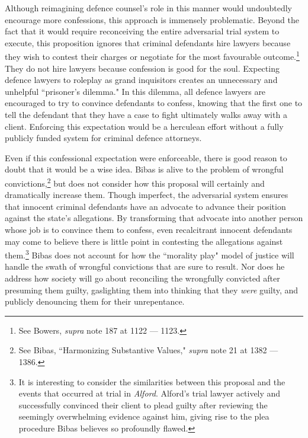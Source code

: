 Although reimagining defence counsel's role in this manner would undoubtedly encourage more confessions, this approach is immensely problematic. Beyond the fact that it would require reconceiving the entire adversarial trial system to execute, this proposition ignores that criminal defendants hire lawyers because they wish to contest their charges or negotiate for the most favourable outcome.\footnote{See Bowers, \textit{supra} note 187 at 1122 — 1123.} They do not hire lawyers because confession is good for the soul. Expecting defence lawyers to roleplay as grand inquisitors creates an unnecessary and unhelpful ``prisoner's dilemma." In this dilemma, all defence lawyers are encouraged to try to convince defendants to confess, knowing that the first one to tell the defendant that they have a case to fight ultimately walks away with a client. Enforcing this expectation would be a herculean effort without a fully publicly funded system for criminal defence attorneys.

Even if this confessional expectation were enforceable, there is good reason to doubt that it would be a wise idea. Bibas is alive to the problem of wrongful convictions,\footnote{See Bibas, ``Harmonizing Substantive Values," \textit{supra} note 21 at 1382 — 1386.} but does not consider how this proposal will certainly and dramatically increase them. Though imperfect, the adversarial system ensures that innocent criminal defendants have an advocate to advance their position against the state's allegations. By transforming that advocate into another person whose job is to convince them to confess, even recalcitrant innocent defendants may come to believe there is little point in contesting the allegations against them.\footnote{It is interesting to consider the similarities between this proposal and the events that occurred at trial in \textit{Alford}. Alford's trial lawyer actively and successfully convinced their client to plead guilty after reviewing the seemingly overwhelming evidence against him, giving rise to the plea procedure Bibas believes so profoundly flawed.} Bibas does not account for how the ``morality play" model of justice will handle the swath of wrongful convictions that are sure to result. Nor does he address how society will go about reconciling the wrongfully convicted after presuming them guilty, gaslighting them into thinking that they \textit{were} guilty, and publicly denouncing them for their unrepentance. 


